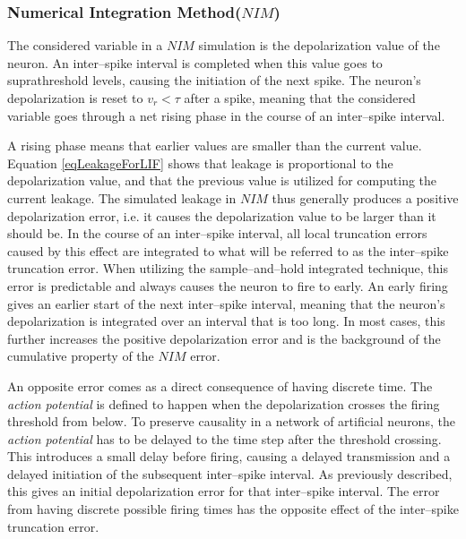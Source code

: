 	\subsubsection{Numerical Integration Method($NIM$)}
		The considered variable in a $NIM$ simulation is the depolarization value of the neuron.
		An inter--spike interval is completed when this value goes to suprathreshold levels, causing the initiation of the next spike. 
		The neuron's depolarization is reset to $v_r < \tau$ after a spike, meaning that the considered variable goes through a net rising phase in the course of an inter--spike interval. 

		A rising phase means that earlier values are smaller than the current value.
		Equation \ref{eqLeakageForLIF} shows that leakage is proportional to the depolarization value, and that the previous value is utilized for computing the current leakage.
		The simulated leakage in $NIM$ thus generally produces a positive depolarization error, i.e. it causes the depolarization value to be larger than it should be.
		In the course of an inter--spike interval, all local truncation errors caused by this effect are integrated to what will be referred to as the inter--spike truncation error.
		When utilizing the sample--and--hold integrated technique, this error is predictable and always causes the neuron to fire to early.
		An early firing gives an earlier start of the next inter--spike interval, meaning that the neuron's depolarization is integrated over an interval that is too long. %
		In most cases, this further increases the positive depolarization error and is the background of the cumulative property of the $NIM$ error.

	
		An opposite error comes as a direct consequence of having discrete time.
		The \emph{action potential} is defined to happen when the depolarization crosses the firing threshold from below.
		To preserve causality in a network of artificial neurons, the \emph{action potential} has to be delayed to the time step after the threshold crossing.
		This introduces a small delay before firing, causing a delayed transmission and a delayed initiation of the subsequent inter--spike interval.
		As previously described, this gives an initial depolarization error for that inter--spike interval.
		The error from having discrete possible firing times has the opposite effect of the inter--spike truncation error. %


